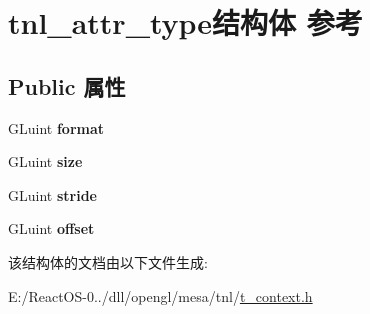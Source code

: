 \hypertarget{structtnl__attr__type}{}\section{tnl\+\_\+attr\+\_\+type结构体 参考}
\label{structtnl__attr__type}
\subsection*{Public 属性}
\begin{DoxyCompactItemize}
\item 
\mbox{\label{structtnl__attr__type_a8ec97961231921733352519a54ce58d1}} 
G\+Luint {\bfseries format}
\item 
\mbox{\label{structtnl__attr__type_a95e96c0fbc816b8c45ba75133e2cf3d7}} 
G\+Luint {\bfseries size}
\item 
\mbox{\label{structtnl__attr__type_adbf9ede53fd5d0dd2885f535cbd7055f}} 
G\+Luint {\bfseries stride}
\item 
\mbox{\label{structtnl__attr__type_a968aec537bcc977d4c52f17b79da2354}} 
G\+Luint {\bfseries offset}
\end{DoxyCompactItemize}


该结构体的文档由以下文件生成\+:\begin{DoxyCompactItemize}
\item 
E\+:/\+React\+O\+S-\/0../dll/opengl/mesa/tnl/\hyperlink{t__context_8h}{t\+\_\+context.\+h}\end{DoxyCompactItemize}
